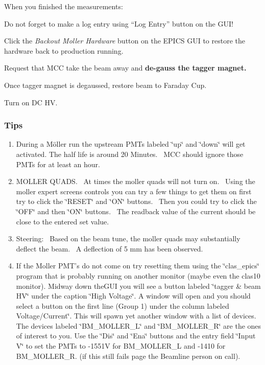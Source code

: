 When you finished the measurements:

Do not forget to make a log entry using ``Log Entry'' button on the GUI! 

Click the \emph{Backout Moller Hardware} button on the EPICS GUI to 
restore the hardware back to production running. 



Request that MCC take the beam away and \textbf{de-gauss the tagger
magnet.}

Once tagger magnet is degaussed, restore beam to Faraday Cup.

Turn on DC HV.


\subsubsection{Tips}

\begin{enumerate}
\item During a M{\"o}ller run the upstream PMTs labeled \char`\"{}up\char`\"{}
and \char`\"{}down\char`\"{} will get activated. The half life is
around 20 Minutes.~ MCC should ignore those PMTs for at least an
hour. 
\item MOLLER QUADS.~ At times the moller quads will not turn on.~ Using the moller expert screens controls you can try a few things to get
them on first try to click the \char`\"{}RESET\char`\"{} and \char`\"{}ON\char`\"{}
buttons.~ Then you could try to click the \char`\"{}OFF\char`\"{}
and then \char`\"{}ON\char`\"{} buttons.~ The readback value of the
current should be close to the entered set value.
\item Steering:~ Based on the beam tune, the moller quads may substantially
deflect the beam.~ A deflection of 5 mm has been observed.~ 
\item If the Moller PMT's do not come on try resetting them using the \char`\"{}clas\_epics\char`\"{}
program that is probably running on another monitor (maybe even the
clas10 monitor). Midway down theGUI you will see a button labeled
\char`\"{}tagger \& beam HV\char`\"{} under the caption \char`\"{}High
Voltage\char`\"{}. A window will open and you should select a button
on the first line (Group 1) under the column labeled Voltage/Current\char`\"{}.
This will spawn yet another window with a list of devices. The devices
labeled \char`\"{}BM\_MOLLER\_L\char`\"{} and \char`\"{}BM\_MOLLER\_R\char`\"{}
are the ones of interest to you. Use the \char`\"{}Dis\char`\"{} and
\char`\"{}Ena\char`\"{} buttons and the entry field \char`\"{}Input
V\char`\"{} to set the PMTs to -1551V for BM\_MOLLER\_L and -1410
for BM\_MOLLER\_R. (if this still fails page the Beamline person on
call).
\end{enumerate}

